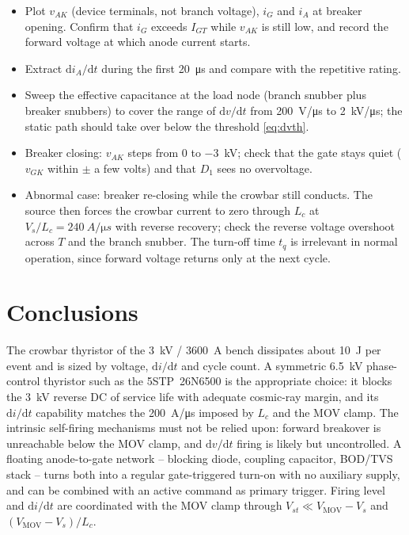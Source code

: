 \documentclass[11pt,a4paper]{article}
\begin{document}
\begin{itemize}
\item Plot $v_{AK}$ (device terminals, not branch voltage), $i_G$ and $i_A$ at breaker opening.
      Confirm that $i_G$ exceeds $I_{GT}$ while $v_{AK}$ is still low, and record the forward voltage
      at which anode current starts.
\item Extract $\mathrm{d}i_A/\mathrm{d}t$ during the first \SI{20}{\micro s} and compare with the
      repetitive rating.
\item Sweep the effective capacitance at the load node (branch snubber plus breaker snubbers) to
      cover the range of $\mathrm{d}v/\mathrm{d}t$ from \SI{200}{V/\micro s} to \SI{2}{kV/\micro s};
      the static path should take over below the threshold \eqref{eq:dvth}.
\item Breaker closing: $v_{AK}$ steps from \SI{0}{} to \SI{-3}{kV}; check that the gate stays
      quiet ($v_{GK}$ within $\pm$ a few volts) and that $D_1$ sees no overvoltage.
\item Abnormal case: breaker re-closing while the crowbar still conducts. The source then forces
      the crowbar current to zero through $L_c$ at $V_s/L_c = \SI{240}{A/\micro s}$ with reverse
      recovery; check the reverse voltage overshoot across $T$ and the branch snubber. The
      turn-off time $t_q$ is irrelevant in normal operation, since forward voltage returns only at
      the next cycle.
\end{itemize}

\section{Conclusions}

The crowbar thyristor of the \SI{3}{kV} / \SI{3600}{A} bench dissipates about \SI{10}{J} per
event and is sized by voltage, $\mathrm{d}i/\mathrm{d}t$ and cycle count. A symmetric
\SI{6.5}{kV} phase-control thyristor such as the 5STP~26N6500 is the appropriate choice: it
blocks the \SI{3}{kV} reverse DC of service life with adequate cosmic-ray margin, and its
$\mathrm{d}i/\mathrm{d}t$ capability matches the \SI{200}{A/\micro s} imposed by $L_c$ and the
MOV clamp. The intrinsic self-firing mechanisms must not be relied upon: forward breakover is
unreachable below the MOV clamp, and $\mathrm{d}v/\mathrm{d}t$ firing is likely but uncontrolled.
A floating anode-to-gate network -- blocking diode, coupling capacitor, BOD/TVS stack -- turns
both into a regular gate-triggered turn-on with no auxiliary supply, and can be combined with
an active command as primary trigger. Firing level and $\mathrm{d}i/\mathrm{d}t$ are coordinated
with the MOV clamp through $V_{st} \ll V_{\mathrm{MOV}} - V_s$ and
$(V_{\mathrm{MOV}} - V_s)/L_c$.
\end{document}
